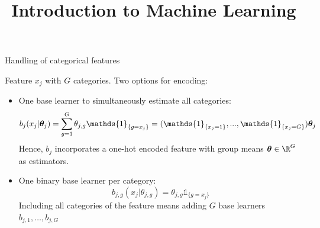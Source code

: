 \documentclass[11pt,compress,t,notes=noshow, xcolor=table]{beamer}
\title{Introduction to Machine Learning}
\begin{document}

\begin{frame2}{Handling of categorical features}

Feature $x_j$ with $G$ categories. Two options for encoding:

\begin{itemize}
    \item 
        One base learner to simultaneously estimate all categories: 
        $$b_j(x_j | \thetav_j) = \sum_{g=1}^G \theta_{j,g}\mathds{1}_{\{g = x_j\}} = (\mathds{1}_{\{x_j = 1\}}, ..., \mathds{1}_{\{x_j = G\}}) \thetav_j$$
        Hence, $b_j$ incorporates a one-hot encoded feature with group means $\thetav\in\R^G$ as estimators. 
    
    \item 
        One binary base learner per category:
        $$b_{j,g}(x_j | \theta_{j,g}) = \theta_{j,g}\mathds{1}_{\{g = x_j\}}$$  
        Including all categories of the feature means adding $G$ base learners $b_{j,1}, \dots, b_{j,G}$ %
  \end{itemize}

\end{frame2}
\end{document}
